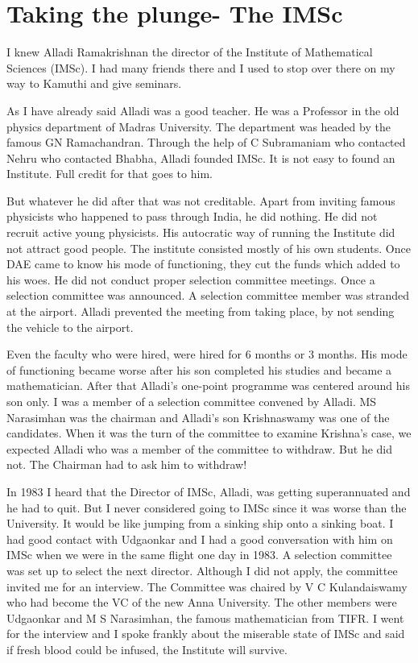 \chapter{Taking the plunge- The IMSc}

I knew Alladi Ramakrishnan the director of the Institute of Ma\-thematical 
Sciences (IMSc). I had many friends there and I used to stop over there 
on my way to Kamuthi and give seminars.

As I have already said Alladi was a good teacher. He was a Professor in 
the old physics department of Madras University. The department was 
headed by the famous GN Ramachandran. Through the help of C Subramaniam 
who contacted Nehru who contacted Bhabha, Alladi founded IMSc. It is not 
easy to found an Institute. Full credit for that goes to him.

But whatever he did after that was not creditable. Apart from inviting 
famous physicists who happened to pass through India, he did nothing. He 
did not recruit active young physicists. His autocratic way of running 
the Institute did not attract good people. The institute consisted 
mostly of his own students. Once DAE came to know his mode of 
functioning, they cut the funds which added to his woes. He did not 
conduct proper selection committee meetings. Once a selection committee 
was announced. A selection committee member was stranded at the airport. 
Alladi prevented the meeting from taking place, by not sending the 
vehicle to the airport.

Even the faculty who were hired, were hired for 6 months or 3 months. 
His mode of functioning became worse after his son completed his studies 
and became a mathematician. After that Alladi's one-point programme was 
centered around his son only. I was a member of a selection committee 
convened by Alla\-di. MS Narasimhan was the chairman and Alladi's son 
Kri\-shnaswamy was one of the candidates. When it was the turn of the 
commi\-ttee to examine Krishna's case, we expected Alladi who was a member 
of the committee to withdraw. But he did not. The Chairman had to ask 
him to withdraw!

In 1983 I heard that the Director of IMSc, Alladi, was getting 
superannuated and he had to quit. But I never consi\-dered going to IMSc 
since it was worse than the University. It would be like jumping from a 
sinking ship onto a sinking boat. I had good contact with Udgaonkar and 
I had a good conversa\-tion with him on IMSc when we were in the same 
flight one day in 1983. A selection committee was set up to select the 
next director. Although I did not apply, the committee invited me for an 
interview. The Committee was chaired by V C Kulandaiswamy who had become 
the VC of the new Anna University. The other members were Udgaonkar and 
M S Narasimhan, the famous mathematician from TIFR. I went for the 
interview and I spoke frankly about the miserable state of IMSc and said 
if fresh blood could be infused, the Institute will survive.

